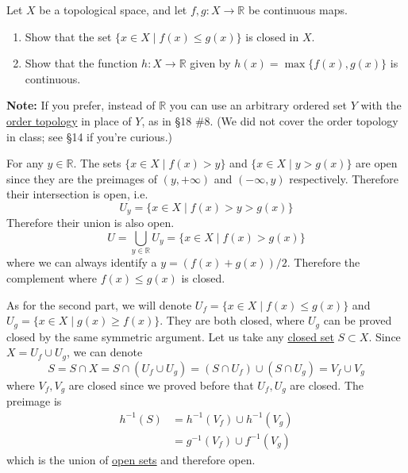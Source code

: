   \begin{exercise}
    Let $X$ be a topological space, and let $f,g: X \to \mathbb{R}$ be continuous maps.
    \begin{enumerate}
      \item Show that the set $\{x \in X \mid f(x) \leq g(x)\}$ is closed in $X$.
      
      \item Show that the function $h: X \to \mathbb{R}$ given by $h(x) = \max\{f(x),g(x)\}$ is continuous.
    \end{enumerate}
    
    \noindent\textbf{Note:} If you prefer, instead of $\mathbb{R}$ you can use an arbitrary ordered set $Y$ with the \hyperref[def:order-topology]{order topology} in place of $Y$, as in \S18 \#8. (We did not cover the order topology in class; see \S14 if you're curious.)
  \end{exercise}
  \begin{solution}
    For any $y \in \mathbb{R}$. The sets $\{x \in X \mid f(x) > y\}$ and $\{x \in X \mid y > g(x)\}$ are open since they are the preimages of $(y, +\infty)$ and $(-\infty, y)$ respectively. Therefore their intersection is open, i.e. 
    \begin{equation}
      U_y = \{x \in X \mid f(x) > y > g(x)\}
    \end{equation} 
    Therefore their union is also open. 
    \begin{equation}
      U = \bigcup_{y \in \mathbb{R}} U_y = \{x \in X \mid f(x) > g(x)\}
    \end{equation}
    where we can always identify a $y = (f(x) + g(x))/2$. Therefore the complement where $f(x) \leq g(x)$ is closed. 
    
    As for the second part, we will denote $U_f = \{x \in X \mid f(x) \leq g(x)\}$ and $U_g = \{x \in X \mid g(x) \geq f(x) \}$. They are both closed, where $U_g$ can be proved closed by the same symmetric argument. Let us take any \hyperref[def:closed]{closed set} $S \subset X$. Since $X = U_f \cup U_g$, we can denote 
    \begin{equation}
      S = S \cap X = S \cap (U_f \cup U_g) = (S \cap U_f) \cup (S \cap U_g) = V_f \cup V_g
    \end{equation}
    where $V_f, V_g$ are closed since we proved before that $U_f, U_g$ are closed. The preimage is 
    \begin{align}
      h^{-1} (S) & = h^{-1} (V_f) \cup h^{-1} (V_g) \\
                 & = g^{-1} (V_f) \cup f^{-1} (V_g)
    \end{align}
    which is the union of \hyperref[def:open-set]{open sets} and therefore open. 
  \end{solution}

